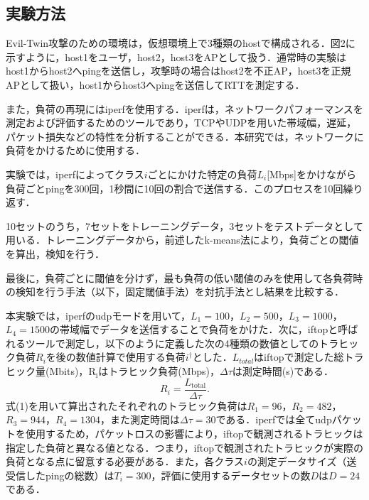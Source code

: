 \documentclass[twocolumn, a4paper]{ieicejsp}
\begin{document}
\subsection{実験方法}
Evil-Twin攻撃のための環境は，仮想環境上で3種類のhostで構成される．図2に示すように，host1をユーザ，host2，host3をAPとして扱う．通常時の実験はhost1からhost2へpingを送信し，攻撃時の場合はhost2を不正AP，host3を正規APとして扱い，host1からhost3へpingを送信してRTTを測定する．\par
また，負荷の再現にはiperfを使用する．iperfは，ネットワークパフォーマンスを測定および評価するためのツールであり，TCPやUDPを用いた帯域幅，遅延，パケット損失などの特性を分析することができる．本研究では，ネットワークに負荷をかけるために使用する．\par
実験では，iperfによってクラス$i$ごとにかけた特定の負荷$L_i$[Mbps]をかけながら負荷ごとpingを300回，1秒間に10回の割合で送信する．このプロセスを10回繰り返す．\par
10セットのうち，7セットをトレーニングデータ，3セットをテストデータとして用いる．トレーニングデータから，前述したk-means法により，負荷ごとの閾値を算出，検知を行う．\par
最後に，負荷ごとに閾値を分けず，最も負荷の低い閾値のみを使用して各負荷時の検知を行う手法（以下，固定閾値手法）を対抗手法とし結果を比較する．\par
本実験では，iperfのudpモードを用いて，$L_1=100$，$L_2=500$，$L_3=1000$，$L_4=1500$の帯域幅でデータを送信することで負荷をかけた．次に，iftopと呼ばれるツールで測定し，以下のように定義した次の4種類の数値としてのトラヒック負荷$R_i$を後の数値計算で使用する負荷$i^\dagger$とした．$L_{total}$はiftopで測定した総トラヒック量(Mbits)，$\mathrm{R_i}$はトラヒック負荷(Mbps)，$\Delta \tau$は測定時間(s)である．
\begin{equation}
R_i = \frac{L_{\mathrm{total}}}{\Delta \tau}.
\end{equation}
式(1)を用いて算出されたそれぞれのトラヒック負荷は$R_1=96$，$R_2=482$，$R_3=944$，$R_4=1304$，また測定時間は${\Delta \tau}=30$である．iperfでは全てudpパケットを使用するため，パケットロスの影響により，iftopで観測されるトラヒックは指定した負荷と異なる値となる．つまり，iftopで観測されたトラヒックが実際の負荷となる点に留意する必要がある．また，各クラス$i$の測定データサイズ（送受信したpingの総数）は$T_i=300$，評価に使用するデータセットの数$D$は$D=24$である．

\begin{comment}
iftopとは，ネットワークインターフェイス上の送受信トラヒックをリアルタイムでモニタリングし，接続元と接続先ごとの帯域使用量を可視化することのできるツールである．
\end{comment}
\end{document}
